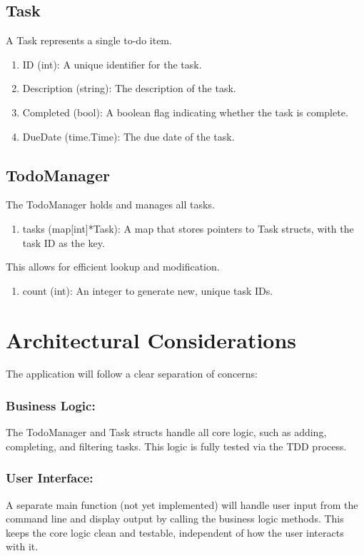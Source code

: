 \documentclass[11pt]{article}
\begin{document}
\subsection{Task}
A Task represents a single to-do item.

\begin{enumerate}
\item ID (int): A unique identifier for the task.
\item Description (string): The description of the task.
\item Completed (bool): A boolean flag indicating whether the task is complete.
\item DueDate (time.Time): The due date of the task.
\end{enumerate}

\subsection{TodoManager}

The TodoManager holds and manages all tasks.

\begin{enumerate}
\item tasks (map[int]*Task): A map that stores pointers to Task structs, with the task ID as the key.
\end{enumerate}
This allows for efficient lookup and modification.

\begin{enumerate}
\item count (int): An integer to generate new, unique task IDs.
\end{enumerate}
\section{Architectural Considerations}
\label{sec:org21f8ae5}
The application will follow a clear separation of concerns:
\subsubsection{Business Logic:}
\label{sec:orgd1d484b}
The TodoManager and Task structs handle all core logic, such as adding, completing, and filtering tasks.
This logic is fully tested via the TDD process.
\subsubsection{User Interface:}
\label{sec:org3c922a5}
A separate main function (not yet implemented) will handle user input from the command line and display output
by calling the business logic methods. This keeps the core logic clean and testable, independent of how the user
interacts with it.
\end{document}
